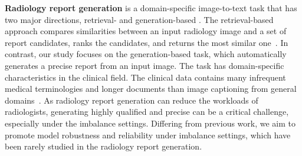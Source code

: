 \documentclass[sn-mathphys-num]{sn-jnl}%
\theoremstyle{thmstyleone}%
\theoremstyle{thmstyletwo}%
\theoremstyle{thmstylethree}%
\begin{document}
\textbf{Radiology report generation} is a domain-specific image-to-text task that has two major directions, retrieval- \cite{endo2021retrieval, jeong2023multimodal} and generation-based \cite{chen2020generating, qin2022reinforced,kale2023replace}. 
The retrieval-based approach compares similarities between an input radiology image and a set of report candidates, ranks the candidates, and returns the most similar one~\cite{liu2021competence, endo2021retrieval, jeong2023multimodal, wang2023metransformer,delbrouck2023overview}. 
In contrast, our study focuses on the generation-based task, which automatically generates a precise report from an input image. 
The task has domain-specific characteristics in the clinical field. 
The clinical data contains many infrequent medical terminologies and longer documents than image captioning from general domains~\cite{lin2014microsoft}.
As radiology report generation can reduce the workloads of radiologists, generating highly qualified and precise can be a critical challenge, especially under the imbalance settings. %
Differing from previous work, we aim to promote model robustness and reliability under imbalance settings, which have been rarely studied in the radiology report generation.
\end{document}
